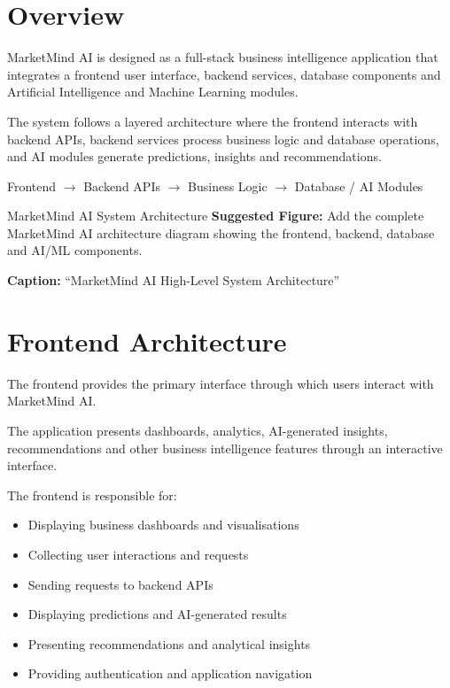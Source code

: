 \documentclass[12pt,a4paper]{report}
\begin{document}
\section{Overview}

MarketMind AI is designed as a full-stack business intelligence
application that integrates a frontend user interface, backend services,
database components and Artificial Intelligence and Machine Learning
modules.

The system follows a layered architecture where the frontend interacts
with backend APIs, backend services process business logic and database
operations, and AI modules generate predictions, insights and
recommendations.

\begin{center}
Frontend
$\rightarrow$
Backend APIs
$\rightarrow$
Business Logic
$\rightarrow$
Database / AI Modules
\end{center}

\begin{screenshotplaceholder}{MarketMind AI System Architecture}
\textbf{Suggested Figure:} Add the complete MarketMind AI architecture
diagram showing the frontend, backend, database and AI/ML components.

\textbf{Caption:} ``MarketMind AI High-Level System Architecture''
\end{screenshotplaceholder}



\section{Frontend Architecture}

The frontend provides the primary interface through which users interact
with MarketMind AI.

The application presents dashboards, analytics, AI-generated insights,
recommendations and other business intelligence features through an
interactive interface.

The frontend is responsible for:

\begin{itemize}
    \item Displaying business dashboards and visualisations
    \item Collecting user interactions and requests
    \item Sending requests to backend APIs
    \item Displaying predictions and AI-generated results
    \item Presenting recommendations and analytical insights
    \item Providing authentication and application navigation
\end{itemize}
\end{document}
